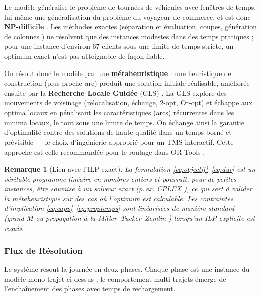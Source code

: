 \documentclass[12pt,a4paper]{report}
\newtheorem{remarque}{Remarque}
\begin{document}
Le modèle généralise le problème de tournées de véhicules avec fenêtres de
temps, lui-même une généralisation du problème du voyageur de commerce, et
est donc \textbf{NP-difficile} \cite{lenstra1981,garey1979}. Les méthodes exactes (séparation et évaluation,
coupes, génération de colonnes \cite{toth2014}) ne résolvent que des
instances modestes dans des temps pratiques ; pour une instance d'environ
$67$ clients sous une limite de temps stricte, un optimum exact n'est pas
atteignable de façon fiable.

On résout donc le modèle par une \textbf{métaheuristique}
\cite{gendreau2010} : une heuristique
de construction (plus proche arc) produit une solution initiale réalisable,
améliorée ensuite par la \textbf{Recherche Locale Guidée} (GLS)
\cite{voudouris1999,voudouris1997}. La GLS explore des mouvements de
voisinage (relocalisation, échange, 2-opt, Or-opt) et échappe aux optima
locaux en pénalisant les caractéristiques (arcs) récurrentes dans les minima
locaux, le tout sous une limite de temps. On échange ainsi la garantie
d'optimalité contre des solutions de haute qualité dans un temps borné et
prévisible --- le choix d'ingénierie approprié pour un TMS interactif.
Cette approche est celle recommandée pour le routage dans OR-Tools
\cite{ortools}.

\begin{remarque}[Lien avec l'ILP exact]
La formulation \eqref{eq:objectif}--\eqref{eq:dur} est un véritable programme
linéaire en nombres entiers et pourrait, pour de petites instances, être
soumise à un solveur exact (p.\,ex. CPLEX \cite{cplex}), ce qui sert à valider
la métaheuristique sur des cas où l'optimum est calculable. Les contraintes
d'implication \eqref{eq:capp}--\eqref{eq:proptemps} sont linéarisées de
manière standard (grand-$M$ ou propagation à la Miller--Tucker--Zemlin
\cite{miller1960}) lorsqu'un ILP explicite est requis.
\end{remarque}

\subsubsection{Flux de Résolution}
\label{sec:flux}

Le système résout la journée en deux phases. Chaque phase est une instance
du modèle mono-trajet ci-dessus ; le comportement multi-trajets émerge de
l'enchaînement des phases avec temps de rechargement.
\end{document}
